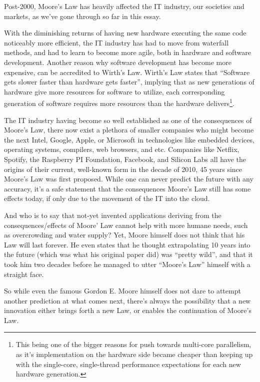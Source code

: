 \documentclass[a4paper,12pt]{article}
\begin{document}
Post-2000, Moore's Law has heavily affected the IT industry, our societies and markets, as we've gone through so far in this essay.

With the diminishing returns of having new hardware executing the same code noticeably more efficient, the IT industry has had to move from waterfall methods\cite{FromWaterfallToAgile}, and had to learn to become more agile\cite{AgileVsWaterfall}, both in hardware and software development.
Another reason why software development has become more expensive, can be accredited to Wirth's Law\cite{TheGreatMoore'sLawCompensator}.
Wirth's Law states that ``Software gets slower faster than hardware gets faster'', implying that as new generations of hardware give more resources for software to utilize, each corresponding generation of software requires more resources than the hardware delivers\footnote{This being one of the bigger reasons for push towards multi-core parallelism, as it's implementation on the hardware side became cheaper than keeping up with the single-core, single-thread performance expectations for each new hardware generation.}.

The IT industry having become so well established as one of the consequences of Moore's Law, there now exist a plethora of smaller companies who might become the next Intel, Google, Apple, or Microsoft in technologies like embedded devices, operating systems, compilers, web browsers, and etc.
Companies like Netflix, Spotify, the Raspberry PI Foundation, Facebook, and Silicon Labs all have the origins of their current, well-known form in the decade of 2010, 45 years since Moore's Law was first proposed. While one can never predict the future with any accuracy, it's a safe statement that the consequences Moore's Law still has some effects today, if only due to the movement of the IT into the cloud\cite{Moore'sLawCloudPricing}.

And who is to say that not-yet invented applications deriving from the consequences/effects of Moore' Law cannot help with more humane needs\cite{Moore'sLawTurns50}, such as overcrowding and water supply?
Yet, Moore himself\cite{MooreSpeculates} does not think that his Law will last forever.
He even states that he thought extrapolating 10 years into the future (which was what his original paper did) was ``pretty wild'', and that it took him two decades before he managed to utter ``Moore's Law'' himself with a straight face.

So while even the famous Gordon E. Moore himself does not dare to attempt another prediction at what comes next, there's always the possibility that a new innovation either brings forth a new Law, or enables the continuation of Moore's Law\cite{FutureForTransistor}.

\clearpage


\end{document}
